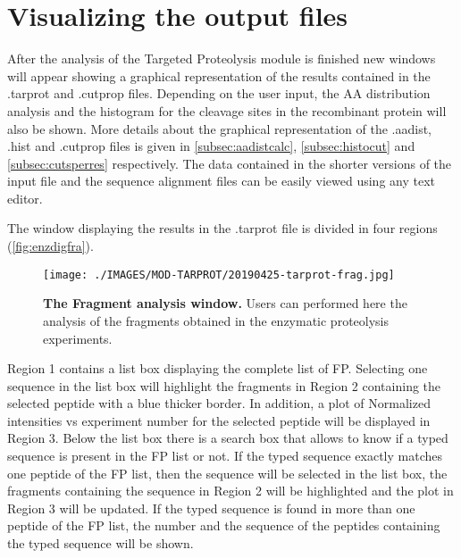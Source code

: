 \section{Visualizing the output files}

After the analysis of the Targeted Proteolysis module is finished new windows will appear showing a graphical representation of the results contained in the .tarprot and .cutprop files. Depending on the user input, the AA distribution analysis and the histogram for the cleavage sites in the recombinant protein will also be shown. More details about the graphical representation of the .aadist, .hist and .cutprop files is given in \autoref{subsec:aadistcalc}, \autoref{subsec:histocut} and \autoref{subsec:cutsperres} respectively. The data contained in the shorter versions of the input file and the sequence alignment files can be easily viewed using any text editor.   

The window displaying the results in the .tarprot file is divided in four regions (\autoref{fig:enzdigfra}).

\begin{figure}[h]
	\centering
	\texttt{[image: ./IMAGES/MOD-TARPROT/20190425-tarprot-frag.jpg]}	    
	\caption[The Fragment analysis window]{\textbf{The Fragment analysis window.} Users can performed here the analysis of the fragments obtained in the enzymatic proteolysis experiments.} 
	\label{fig:enzdigfra}
	\vspace{-5pt} 	
\end{figure} 

Region \num{1} contains a list box displaying the complete list of FP. Selecting one sequence in the list box will highlight the fragments in Region \num{2} containing the selected peptide with a blue thicker border. In addition, a plot of Normalized intensities vs experiment number for the selected peptide will be displayed in Region \num{3}. Below the list box there is a search box that allows to know if a typed sequence is present in the FP list or not. If the typed sequence exactly matches one peptide of the FP list, then the sequence will be selected in the list box, the fragments containing the sequence in Region \num{2} will be highlighted and the plot in Region \num{3} will be updated. If the typed sequence is found in more than one peptide of the FP list, the number and the sequence of the peptides containing the typed sequence will be shown.

